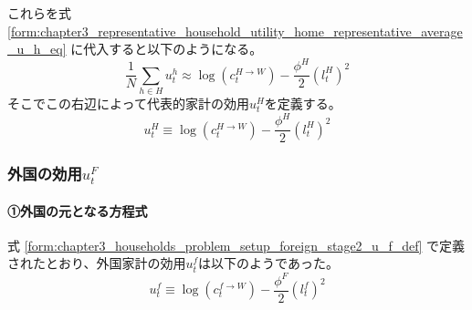これらを式
\eqref{form:chapter3_representative_household_utility_home_representative_average_u_h_eq}
に代入すると以下のようになる。
\begin{equation}
\label{form:chapter3_representative_household_utility_home_representative_average_u_h_modified_eq}
    \frac{1}{N}\sum_{h\in H}u_t^h\approx\log(c_t^{H\to W})-\frac{\phi^H}{2}(l_t^H)^2
\end{equation}
そこでこの右辺によって代表的家計の効用\(u_t^H\)を定義する。
\begin{equation}
\label{form:chapter3_representative_household_utility_home_representative_u_H_def}
    u_t^H\equiv\log(c_t^{H\to W})-\frac{\phi^H}{2}(l_t^H)^2
\end{equation}

\subsubsection{外国の効用\(u_t^F\)}
\label{sec:chapter3_representative_household_utility_foreign}

\paragraph{①外国の元となる方程式}
\label{sec:chapter3_representative_household_utility_foreign_original}
式
\eqref{form:chapter3_households_problem_setup_foreign_stage2_u_f_def}
で定義されたとおり、外国家計の効用\(u_t^f\)は以下のようであった。
\begin{equation}
\label{form:chapter3_representative_household_utility_foreign_original_u_f_def}
    u_t^f\equiv\log(c_t^{f\to W})-\frac{\phi^F}{2}(l_t^f)^2
\end{equation}

